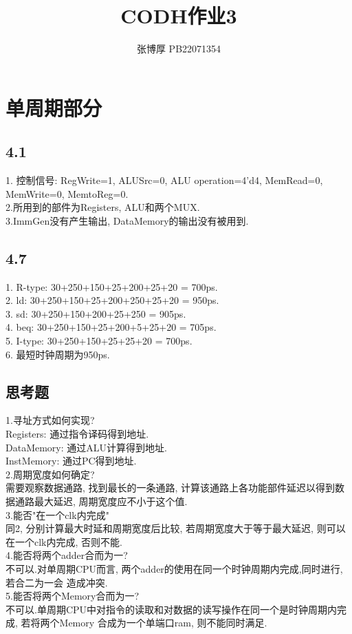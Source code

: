 \documentclass{article}
\title{CODH作业3}
\author{张博厚 PB22071354}
\date{}
\begin{document}
\maketitle
\section*{单周期部分}
\subsection*{4.1}
1. 控制信号: RegWrite=1, ALUSrc=0, ALU operation=4'd4, MemRead=0, MemWrite=0,
MemtoReg=0.\\
2.所用到的部件为Registers, ALU和两个MUX.\\
3.ImmGen没有产生输出, DataMemory的输出没有被用到.
\subsection*{4.7}
1. R-type: 30+250+150+25+200+25+20 = 700ps.\\
2. ld: 30+250+150+25+200+250+25+20 = 950ps.\\
3. sd: 30+250+150+200+25+250 = 905ps.\\
4. beq: 30+250+150+25+200+5+25+20 = 705ps.\\
5. I-type: 30+250+150+25+25+20 = 700ps.\\
6. 最短时钟周期为950ps.
\subsection*{思考题}
1.寻址方式如何实现?\\
\hspace*{0.5cm}Registers: 通过指令译码得到地址.\\
\hspace*{0.5cm}DataMemory: 通过ALU计算得到地址.\\
\hspace*{0.5cm}InstMemory: 通过PC得到地址.\\
2.周期宽度如何确定?\\
\hspace*{0.5cm}需要观察数据通路, 找到最长的一条通路, 计算该通路上各功能部件延迟以得到数据通路最大延迟, 
周期宽度应不小于这个值.\\
3.能否"在一个clk内完成"\\
\hspace*{0.5cm}同2, 分别计算最大时延和周期宽度后比较, 若周期宽度大于等于最大延迟, 则可以在一个clk内完成,
否则不能.\\
4.能否将两个adder合而为一?\\
\hspace*{0.5cm}不可以.对单周期CPU而言, 两个adder的使用在同一个时钟周期内完成,同时进行, 若合二为一会
造成冲突.\\
5.能否将两个Memory合而为一?\\
\hspace*{0.5cm}不可以.单周期CPU中对指令的读取和对数据的读写操作在同一个是时钟周期内完成, 若将两个Memory
合成为一个单端口ram, 则不能同时满足.
\end{document}
